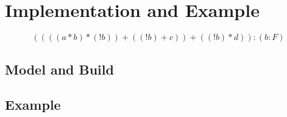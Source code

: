 \section{Implementation and Example}
\begin{example}
\[
	((((a*b)*(!b))+((!b)+c))+((!b)*d)):(b:F)
\]
\end{example}

\subsection{Model and Build}
\subsection{Example}